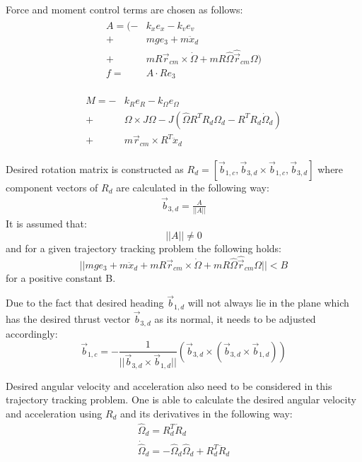 Force and moment control terms are chosen as follows:
\begin{align}
	\begin{split}
		A = (-& k_x e_x - k_v e_v \\
		+& mge_3 + m\ddot{x}_d \\
		+& mR\vec{r}_{cm}  \times \dot{\Omega} + mR\hat{\Omega}\hat{\vec{r}}_{cm}\Omega ) \\
		f =& A \cdot Re_3 \label{force_control}
	\end{split}
\end{align}

\begin{align}
	\begin{split}
		M = -& k_R e_R - k_\Omega e_\Omega \\
			+& \Omega \times J\Omega - J(\hat{\Omega}R^TR_d\Omega_d - R^TR_d\dot{\Omega}_d) \\
			+& m\vec{r}_{cm} \times R^T \ddot{x}_d
	\end{split}
\end{align}

Desired rotation matrix is constructed as 
$R_d = [\vec{b}_{1,c}, \vec{b}_{3,d} \times \vec{b}_{1,c}, \vec{b}_{3,d}]$ where component vectors of $R_d$ are calculated in the following way:
\begin{gather}
	\vec{b}_{3,d} = \frac{A}{|| A ||}
\end{gather}
\noindent It is assumed that:
\begin{equation}
	|| A || \neq 0
\end{equation}
and for a given trajectory tracking problem the following holds:
\begin{equation}
	|| mge_3 + m\ddot{x}_d 
	+ mR\vec{r}_{cm}  \times \dot{\Omega} + mR\hat{\Omega}\hat{\vec{r}}_{cm}\Omega|| < B
\end{equation}
for a positive constant B.

Due to the fact that desired heading $\vec{b}_{1,d}$ will not always lie in the plane which has the desired thrust vector $\vec{b}_{3,d}$ as its normal, it needs to be adjusted accordingly:
\begin{equation}
	\vec{b}_{1,c} = -\frac{1}{||\vec{b}_{3,d} \times \vec{b}_{1,d}||}(\vec{b}_{3,d} \times (\vec{b}_{3,d} \times \vec{b}_{1,d}))
\end{equation}

Desired angular velocity and acceleration also need to be considered in this trajectory tracking problem. One is able to calculate the desired angular velocity and acceleration using $R_d$ and its derivatives in the following way:
\begin{gather}
	\hat{\Omega}_d = R_d^T \dot{R}_d \\
	\dot{\hat{\Omega}}_d = - \hat{\Omega}_d\hat{\Omega}_d + R_d^T \ddot{R}_d
\end{gather}

